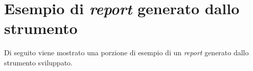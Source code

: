 \chapter{Esempio di \textit{report} generato dallo strumento}

Di seguito viene mostrato una porzione di esempio di un \textit{report} generato dallo strumento sviluppato.

